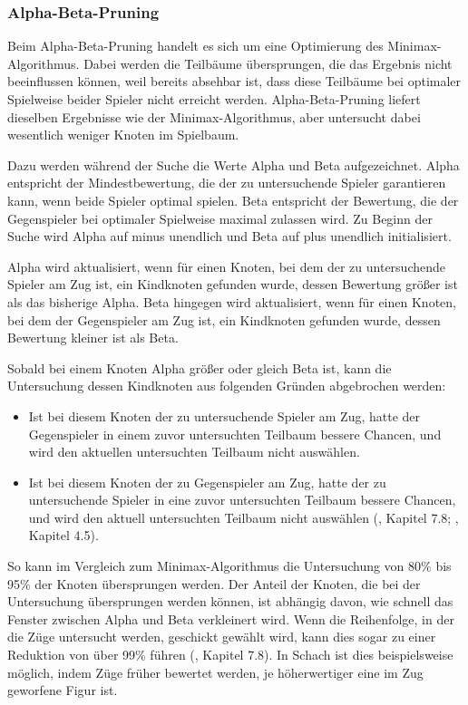 \subsubsection{Alpha-Beta-Pruning}

Beim Alpha-Beta-Pruning handelt es sich um eine Optimierung des Minimax-Algorithmus. Dabei werden die Teilbäume übersprungen, die das Ergebnis nicht beeinflussen können, weil bereits absehbar ist, dass diese Teilbäume bei optimaler Spielweise beider Spieler nicht erreicht werden. Alpha-Beta-Pruning liefert dieselben Ergebnisse wie der Minimax-Algorithmus, aber untersucht dabei wesentlich weniger Knoten im Spielbaum.

Dazu werden während der Suche die Werte Alpha und Beta aufgezeichnet. Alpha entspricht der Mindestbewertung, die der zu untersuchende Spieler garantieren kann, wenn beide Spieler optimal spielen. Beta entspricht der Bewertung, die der Gegenspieler bei optimaler Spielweise maximal zulassen wird. Zu Beginn der Suche wird Alpha auf minus unendlich und Beta auf plus unendlich initialisiert.

Alpha wird aktualisiert, wenn für einen Knoten, bei dem der zu untersuchende Spieler am Zug ist, ein Kindknoten gefunden wurde, dessen Bewertung größer ist als das bisherige Alpha. Beta hingegen wird aktualisiert, wenn für einen Knoten, bei dem der Gegenspieler am Zug ist, ein Kindknoten gefunden wurde, dessen Bewertung kleiner ist als Beta.

Sobald bei einem Knoten Alpha größer oder gleich Beta ist, kann die Untersuchung dessen Kindknoten aus folgenden Gründen abgebrochen werden:

\begin{itemize}
	\item Ist bei diesem Knoten der zu untersuchende Spieler am Zug, hatte der Gegenspieler in einem zuvor untersuchten Teilbaum bessere Chancen, und wird den aktuellen untersuchten Teilbaum nicht auswählen.
	\item Ist bei diesem Knoten der zu Gegenspieler am Zug, hatte der zu untersuchende Spieler in eine zuvor untersuchten Teilbaum bessere Chancen, und wird den aktuell untersuchten Teilbaum nicht auswählen (\cite{Heineman.October2008}, Kapitel 7.8; \cite{Ferguson.January2019}, Kapitel 4.5).
\end{itemize}

So kann im Vergleich zum Minimax-Algorithmus die Untersuchung von 80\% bis 95\% der Knoten übersprungen werden. Der Anteil der Knoten, die bei der Untersuchung übersprungen werden können, ist abhängig davon, wie schnell das Fenster zwischen Alpha und Beta verkleinert wird. Wenn die Reihenfolge, in der die Züge untersucht werden, geschickt gewählt wird, kann dies sogar zu einer Reduktion von über 99\% führen (\cite{Heineman.October2008}, Kapitel 7.8). In Schach ist dies beispielsweise möglich, indem Züge früher bewertet werden, je höherwertiger eine im Zug geworfene Figur ist.

